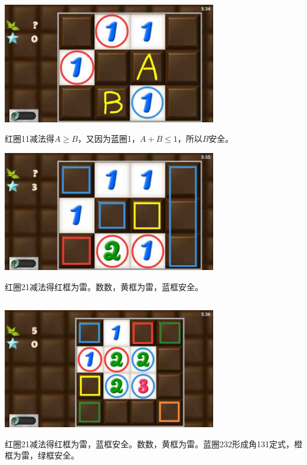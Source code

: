 \subsection{} %
\begin{center}
    \includegraphics[width=0.7\textwidth]{puzzlelow/61-1.jpg}
\end{center}
红圈11减法得$A\ge B$，又因为蓝圈1，$A+B\le 1$，所以$B$安全。
\begin{center}
    \includegraphics[width=0.7\textwidth]{puzzlelow/61-2.jpg}
\end{center}
红圈21减法得红框为雷。数数，黄框为雷，蓝框安全。

\subsection{} %
\begin{center}
    \includegraphics[width=0.7\textwidth]{puzzlelow/62-1.jpg}
\end{center}
红圈21减法得红框为雷，蓝框安全。数数，黄框为雷。蓝圈232形成角131定式，橙框为雷，绿框安全。

